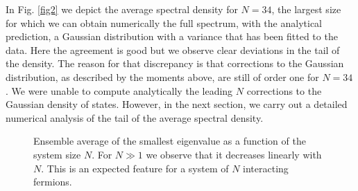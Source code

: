 \documentclass[aps,showpacs,floatfix,superscriptaddress,pre,11pt]{revtex4-1}
\begin{document}
 In Fig. \ref{fig2} we depict the  average spectral density for $N = 34$, the largest size for which we can obtain numerically the full spectrum, with the analytical prediction, a Gaussian distribution
with a variance that has been fitted to the data. Here the agreement is good but we observe clear deviations in the tail of the density. The reason for that discrepancy is that corrections to the Gaussian distribution, as described by the moments above,  are still of order one for $N = 34$. We were unable to compute analytically the leading $N$ corrections to the Gaussian density of states.
However, in the next section, we carry out a detailed numerical analysis of the tail of the average spectral density.
 
\begin{figure}[t!]%
	\centering
	\caption{Ensemble average of the smallest eigenvalue as a function of the system size $N$.
		For $N \gg 1$ we observe that it decreases linearly with $N$. This is an expected feature for
		a system of $N$ interacting fermions.}
	\label{fig4}
\end{figure}
\end{document}
